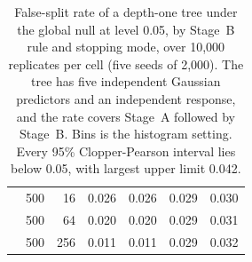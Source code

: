 \begin{table}[tb]
\begin{tabular}{@{}lrrcccc@{}}
     & 500 & 16 & 0.026 & 0.026 & 0.029 & 0.030 \\
     & 500 & 64 & 0.020 & 0.020 & 0.029 & 0.031 \\
     & 500 & 256 & 0.011 & 0.011 & 0.029 & 0.032 \\
    \bottomrule
  \end{tabular}
  \caption{False-split rate of a depth-one tree under the global null at level
  0.05, by Stage~B rule and stopping mode, over 10,000 replicates per cell
  (five seeds of 2,000). The tree has five independent Gaussian predictors and
  an independent response, and the rate covers Stage~A followed by Stage~B.
  Bins is the histogram setting. Every 95\% Clopper-Pearson interval lies below
  0.05, with largest upper limit 0.042.}
  \label{tab:stageB-calibration}
\end{table}

